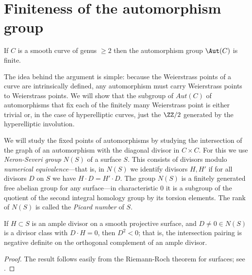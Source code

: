 \section{Finiteness of the automorphism group}\label{finiteness section}


\begin{theorem}\label{finite autos}
If $C$ is a smooth curve of genus $\geq 2$ then the automorphism group $\Aut(C)$ is finite.
\end{theorem}

  The idea behind the argument is simple: because the Weierstrass points of a curve are intrinsically defined, any automorphism must carry Weierstrass points to Weierstrass points. We will show that the subgroup of $Aut(C)$ of automorphisms that fix each  of the finitely many Weierstrass point is either
 trivial or, in the case of hyperelliptic curves, just the $\ZZ/2$ generated by the hyperelliptic involution.
    
We will study the fixed points of automorphisms by studying the intersection of the graph of
an automorphism with the diagonal divisor in $C\times C$. For this we use
\emph{Neron-Severi group} $N(S)$ of a surface $S$. This consists of divisors modulo \emph{numerical equivalence}---that is, in $N(S)$ we identify divisors $H, H'$ if for all divisors $D$ on $S$ we have $H\cdot D = H'\cdot D$. The group
$N(S)$ is a  finitely generated free abelian group for any surface---in characteristic 0 it is a subgroup of the quotient of the second integral homology group by its torsion elements. The rank of $N(S)$ is called the \emph{Picard number} of $S$. 

\begin{theorem}\label{hodge index}
If $H\subset S$ is an ample divisor on a smooth projective surface, and $D \neq 0 \in N(S)$ is a divisor class with $D\cdot H = 0$, then 
$D^2<0$; that is, the intersection pairing is negative definite on the orthogonal complement of an
ample divisor.
\end{theorem}
\begin{proof}
The result follows easily from the Riemann-Roch theorem for surfaces; see \cite[Theorem V.1.9]{Hartshorne1977}.
\end{proof}

